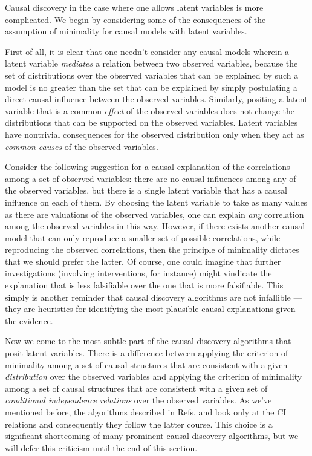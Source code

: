 \documentclass[letterpaper,onecolumn,nofootinbib]{revtex4}
\begin{document}
Causal discovery in the case where one allows latent variables is more complicated.
We begin by considering some of the consequences of the assumption of minimality for causal models with latent variables.

First of all, it is clear that one needn't consider any causal models wherein a latent variable
\emph{mediates} a relation between two observed variables, because the set of
distributions over the observed variables that can be explained by such a model is no greater
than the set that can be explained by simply postulating a direct causal
influence between the observed variables.  Similarly, positing a latent variable that is a common \emph{effect} of the observed variables does not change the distributions that can be supported on the observed variables.  Latent variables have nontrivial consequences for the observed distribution only when they act as \emph{common causes} of the observed variables.

Consider the following suggestion for a causal explanation of
the correlations among a set of observed variables: there are no causal
influences among any of the observed variables, but there is a single latent
variable that has a causal influence on each of them. By choosing the
latent variable to take as many values as there are valuations of the
observed variables, one can explain \emph{any} correlation among the
observed variables in this way. However, if there exists another causal model that
can only reproduce a smaller set of possible correlations, while reproducing
the observed correlations, then the principle of minimality dictates that we
should prefer the latter. Of course, one could imagine that further
investigations (involving interventions, for instance) might vindicate the
explanation that is less falsifiable over the one that is more falsifiable.
This simply is another reminder that causal discovery algorithms are not
infallible --- they are heuristics for identifying the most plausible causal
explanations given the evidence.

Now we come to the most subtle part of the causal discovery algorithms that posit latent variables.
There is a difference between applying the criterion of minimality among a set of causal structures that are consistent with a given \emph{distribution} over the observed variables and applying the criterion of minimality among a set of causal structures that are consistent with a given set of \emph{conditional independence relations} over the observed variables.
As we've mentioned before, the algorithms described in Refs. \cite{Pearl2009} and \cite{Spirtes2001} look only at the CI relations and consequently they follow the latter course.  This choice is a significant shortcoming of many prominent causal discovery algorithms, but we will defer this criticism until the end of this section.
\end{document}

